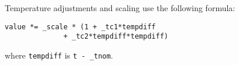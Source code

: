 Temperature adjustments and scaling use the following formula:
\begin{verbatim}
value *= _scale * (1 + _tc1*tempdiff 
              + _tc2*tempdiff*tempdiff)
\end{verbatim}
where {\tt tempdiff} is {\tt t - \_tnom}.

